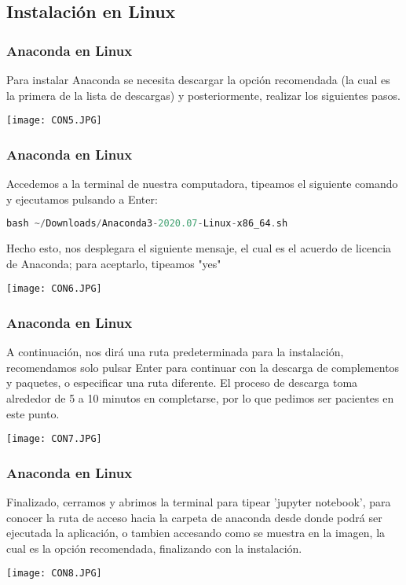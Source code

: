 \documentclass[spanish]{beamer}
\begin{document}
\newpage\subsection{Instalación en Linux}
\begin{frame}\frametitle{Anaconda en Linux}
\setlength{\parskip}{5mm}\justify
Para instalar Anaconda se necesita descargar la opción recomendada (la cual es la primera de la lista de descargas) y posteriormente, realizar los siguientes pasos. 

\centering\texttt{[image: CON5.JPG]}

\end{frame}
\newpage
\begin{frame}[fragile]\frametitle{Anaconda en Linux}
\setlength{\parskip}{5mm}\justify
Accedemos a la terminal de nuestra computadora, tipeamos el siguiente comando y ejecutamos pulsando a Enter:
\begin{lstlisting}[language=c++]
bash ~/Downloads/Anaconda3-2020.07-Linux-x86_64.sh\end{lstlisting}

Hecho esto, nos desplegara el siguiente mensaje, el cual es el acuerdo de licencia de Anaconda; para aceptarlo, tipeamos "yes"

\centering\texttt{[image: CON6.JPG]}

\end{frame}
\newpage
\begin{frame}[fragile]\frametitle{Anaconda en Linux}
\setlength{\parskip}{5mm}\justify
A continuación, nos dirá una ruta predeterminada para la instalación, recomendamos solo pulsar Enter para continuar con la descarga de complementos y paquetes, o especificar una ruta diferente. El proceso de descarga toma alrededor de 5 a 10 minutos en completarse, por lo que pedimos ser pacientes en este punto.

\centering\texttt{[image: CON7.JPG]}

\end{frame}
\newpage
\begin{frame}[fragile]\frametitle{Anaconda en Linux}
\setlength{\parskip}{5mm}\justify
Finalizado, cerramos y abrimos la terminal para tipear 'jupyter notebook', para conocer la ruta de acceso hacia la carpeta de anaconda desde donde podrá ser ejecutada la aplicación, o tambien accesando como se muestra en la imagen, la cual es la opción recomendada, finalizando con la instalación.

\centering\texttt{[image: CON8.JPG]}

\end{frame}
\end{document}
